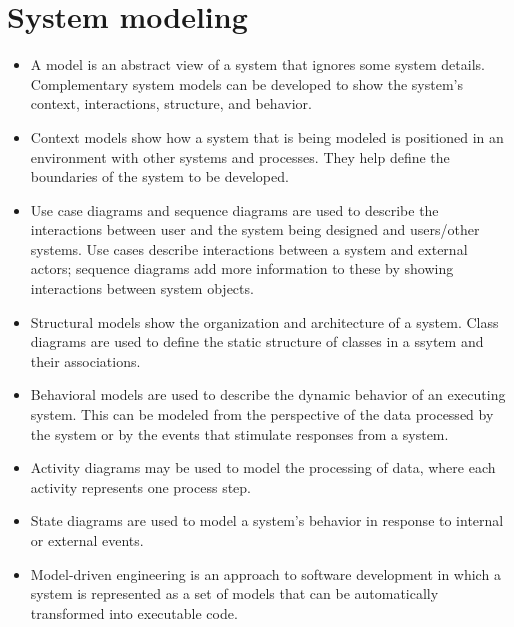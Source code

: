 \documentclass{article}
\begin{document}
\section{System modeling}
\begin{itemize}
    \item A model is an abstract view of a system that ignores some system details.  Complementary system models can be developed to show the system's context, interactions, structure, and behavior.
    \item Context models show how a system that is being modeled is positioned in an environment with other systems and processes.  They help define the boundaries of the system to be developed.
    \item Use case diagrams and sequence diagrams are used to describe the interactions between user and the system being designed and users/other systems.  Use cases describe interactions between a system and external actors; sequence diagrams add more information to these by showing interactions between system objects.
    \item Structural models show the organization and architecture of a system.  Class diagrams are used to define the static structure of classes in a ssytem and their associations.
    \item Behavioral models are used to describe the dynamic behavior of an executing system.  This can be modeled from the perspective of the data processed by the system or by the events that stimulate responses from a system.
    \item Activity diagrams may be used to model the processing of data, where each activity represents one process step.
    \item State diagrams are used to model a system's behavior in response to internal or external events.
    \item Model-driven engineering is an approach to software development in which a system is represented as a set of models that can be automatically transformed into executable code.
\end{itemize}
\end{document}
